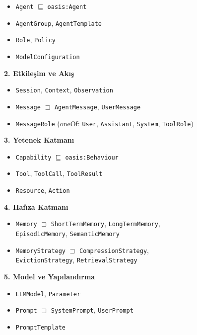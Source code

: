 \documentclass[10pt, a4paper, twocolumn]{article}
\begin{document}
\begin{itemize}
\item \texttt{Agent} $\sqsubseteq$ \texttt{oasis:Agent}
\item \texttt{AgentGroup}, \texttt{AgentTemplate}
\item \texttt{Role}, \texttt{Policy}
\item \texttt{ModelConfiguration}
\end{itemize}

\noindent\textbf{2. Etkileşim ve Akış}

\begin{itemize}
\item \texttt{Session}, \texttt{Context}, \texttt{Observation}
\item \texttt{Message} $\sqsupset$ \texttt{AgentMessage}, \texttt{UserMessage}
\item \texttt{MessageRole} (oneOf: \texttt{User}, \texttt{Assistant}, \texttt{System}, \texttt{ToolRole})
\end{itemize}

\noindent\textbf{3. Yetenek Katmanı}

\begin{itemize}
\item \texttt{Capability} $\sqsubseteq$ \texttt{oasis:Behaviour}
\item \texttt{Tool}, \texttt{ToolCall}, \texttt{ToolResult}
\item \texttt{Resource}, \texttt{Action}
\end{itemize}

\noindent\textbf{4. Hafıza Katmanı}

\begin{itemize}
\item \texttt{Memory} $\sqsupset$ \texttt{ShortTermMemory}, \texttt{LongTermMemory},\\ \texttt{EpisodicMemory}, \texttt{SemanticMemory}
\item \texttt{MemoryStrategy} $\sqsupset$ \texttt{CompressionStrategy},\\ \texttt{EvictionStrategy}, \texttt{RetrievalStrategy}
\end{itemize}

\noindent\textbf{5. Model ve Yapılandırma}

\begin{itemize}
\item \texttt{LLMModel}, \texttt{Parameter}
\item \texttt{Prompt} $\sqsupset$ \texttt{SystemPrompt}, \texttt{UserPrompt}
\item \texttt{PromptTemplate}
\end{itemize}
\end{document}
